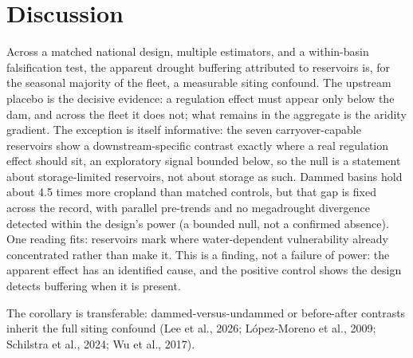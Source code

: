 \documentclass[
]{agujournal2019}
\begin{document}
\section{Discussion}\label{discussion}

Across a matched national design, multiple estimators, and a
within-basin falsification test, the apparent drought buffering
attributed to reservoirs is, for the seasonal majority of the fleet, a
measurable siting confound. The upstream placebo is the decisive
evidence: a regulation effect must appear only below the dam, and across
the fleet it does not; what remains in the aggregate is the aridity
gradient. The exception is itself informative: the seven
carryover-capable reservoirs show a downstream-specific contrast exactly
where a real regulation effect should sit, an exploratory signal bounded
below, so the null is a statement about storage-limited reservoirs, not
about storage as such. Dammed basins hold about 4.5 times more cropland
than matched controls, but that gap is fixed across the record, with
parallel pre-trends and no megadrought divergence detected within the
design's power (a bounded null, not a confirmed absence). One reading
fits: reservoirs mark where water-dependent vulnerability already
concentrated rather than make it. This is a finding, not a failure of
power: the apparent effect has an identified cause, and the positive
control shows the design detects buffering when it is present.

The corollary is transferable: dammed-versus-undammed or before-after
contrasts inherit the full siting confound (Lee et al., 2026;
López‐Moreno et al., 2009; Schilstra et al., 2024; Wu et al., 2017).
\end{document}
